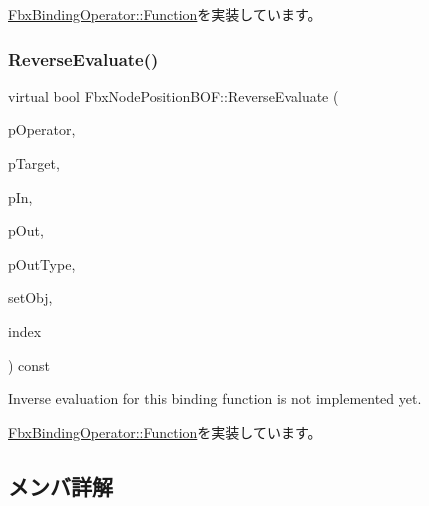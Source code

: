 \hyperlink{class_fbx_binding_operator_1_1_function_aa238a63d12508db3cb5c00a4b157524e}{Fbx\+Binding\+Operator\+::\+Function}を実装しています。

\mbox{\label{class_fbx_node_position_b_o_f_a1f42ed86523fe35e64c63ee1c85dc22a}} 
\subsubsection{\texorpdfstring{Reverse\+Evaluate()}{ReverseEvaluate()}}
{\footnotesize\ttfamily virtual bool Fbx\+Node\+Position\+B\+O\+F\+::\+Reverse\+Evaluate (\begin{DoxyParamCaption}\item[{const \hyperlink{class_fbx_binding_operator}{Fbx\+Binding\+Operator} $\ast$}]{p\+Operator,  }\item[{const \hyperlink{class_fbx_object}{Fbx\+Object} $\ast$}]{p\+Target,  }\item[{const void $\ast$}]{p\+In,  }\item[{void $\ast$$\ast$}]{p\+Out,  }\item[{\hyperlink{fbxpropertytypes_8h_a73913a5ddfb20e57c6f25e9e6784bd92}{E\+Fbx\+Type} $\ast$}]{p\+Out\+Type,  }\item[{bool}]{set\+Obj,  }\item[{int}]{index }\end{DoxyParamCaption}) const\hspace{0.3cm}{\ttfamily [virtual]}}



Inverse evaluation for this binding function is not implemented yet. 



\hyperlink{class_fbx_binding_operator_1_1_function_a9bbeec993a6e453a6569e7f40a85fd52}{Fbx\+Binding\+Operator\+::\+Function}を実装しています。



\subsection{メンバ詳解}
\mbox{\label{class_fbx_node_position_b_o_f_aaa0c4610384d1dbb4e566bad44c356ee}} 
